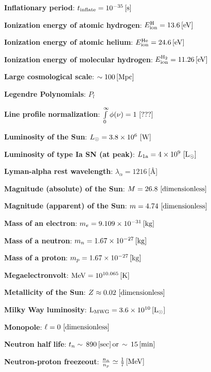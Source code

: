 \documentclass[a4paper,11pt]{article}
\begin{document}
{\noindent}\textbf{Inflationary period}: $t_\mathrm{inflate} = 10^{-35}\,[{\rm s}]$

{\noindent}\textbf{Ionization energy of atomic hydrogen}: $E_\mathrm{ion}^\mathrm{H} = 13.6\,[{\rm eV}]$

{\noindent}\textbf{Ionization energy of atomic helium}: $E_\mathrm{ion}^\mathrm{He} = 24.6\,[{\rm eV}]$

{\noindent}\textbf{Ionization energy of molecular hydrogen}: $E_\mathrm{ion}^\mathrm{H_2} = 11.26\,[{\rm eV}]$

{\noindent}\textbf{Large cosmological scale}: $\sim 100\,[{\rm Mpc}]$

{\noindent}\textbf{Legendre Polynomials}: $P_l$

{\noindent}\textbf{Line profile normalization}: $\int\limits_0^\infty \phi(\nu)=1 ~ [{\rm ???}]$

{\noindent}\textbf{Luminosity of the Sun}: $L_\odot=3.8\times10^6 ~ [{\rm W}]$

{\noindent}\textbf{Luminosity of type Ia SN (at peak)}: $L_\mathrm{1a}=4\times10^9 ~ [{\rm L_\odot}]$

{\noindent}\textbf{Lyman-alpha rest wavelength}: $\lambda_\alpha = 1216$\,[\AA]

{\noindent}\textbf{Magnitude (absolute) of the Sun}: $M = 26.8 ~ [{\rm dimensionless}]$

{\noindent}\textbf{Magnitude (apparent) of the Sun}: $m = 4.74 ~ [{\rm dimensionless}]$

{\noindent}\textbf{Mass of an electron}: $m_e = 9.109\times10^{-31}\,[{\rm kg}]$

{\noindent}\textbf{Mass of a neutron}: $m_n = 1.67\times10^{-27}\,[{\rm kg}]$

{\noindent}\textbf{Mass of a proton}: $m_p = 1.67\times10^{-27}\,[{\rm kg}]$

{\noindent}\textbf{Megaelectronvolt}: ${\rm MeV} = 10^{10.065}\,[{\rm K}]$

{\noindent}\textbf{Metallicity of the Sun}: $Z\approx0.02 ~ [{\rm dimensionless}]$

{\noindent}\textbf{Milky Way luminosity}: ${\rm L_{MWG}} = 3.6\times10^{10}\,[{\rm L}_\odot]$

{\noindent}\textbf{Monopole}: $\ell=0 ~ [{\rm dimensionless}]$

{\noindent}\textbf{Neutron half life}: $t_n\sim\,890\,[{\rm sec}]\,{\rm or}\,\sim\,15\,[{\rm min}]$

{\noindent}\textbf{Neutron-proton freezeout}: $\frac{n_n}{n_p} \simeq \frac{1}{7}\,[{\rm MeV}]$
\end{document}
